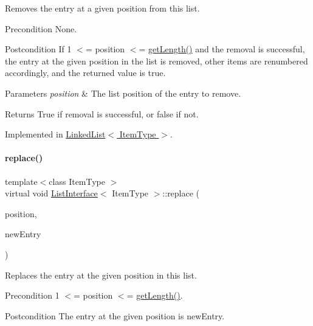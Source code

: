 Removes the entry at a given position from this list. \begin{DoxyPrecond}{Precondition}
None. 
\end{DoxyPrecond}
\begin{DoxyPostcond}{Postcondition}
If 1 $<$= position $<$= \hyperlink{class_list_interface_afc85695d4137f1e29ff02e179c9f3221}{get\+Length()} and the removal is successful, the entry at the given position in the list is removed, other items are renumbered accordingly, and the returned value is true. 
\end{DoxyPostcond}

\begin{DoxyParams}{Parameters}
{\em position} & The list position of the entry to remove. \\
\hline
\end{DoxyParams}
\begin{DoxyReturn}{Returns}
True if removal is successful, or false if not. 
\end{DoxyReturn}


Implemented in \hyperlink{class_linked_list_a16a02716b5b2efb6fb1e3d18721b53e4}{Linked\+List$<$ Item\+Type $>$}.

\hypertarget{class_list_interface_aae877a56b7b9f5f526c37a00e234fad1}{}\label{class_list_interface_aae877a56b7b9f5f526c37a00e234fad1} 
\paragraph{\texorpdfstring{replace()}{replace()}}
{\footnotesize\ttfamily template$<$class Item\+Type $>$ \\
virtual void \hyperlink{class_list_interface}{List\+Interface}$<$ Item\+Type $>$\+::replace (\begin{DoxyParamCaption}\item[{int}]{position,  }\item[{const Item\+Type \&}]{new\+Entry }\end{DoxyParamCaption})\hspace{0.3cm}{\ttfamily [pure virtual]}}

Replaces the entry at the given position in this list. \begin{DoxyPrecond}{Precondition}
1 $<$= position $<$= \hyperlink{class_list_interface_afc85695d4137f1e29ff02e179c9f3221}{get\+Length()}. 
\end{DoxyPrecond}
\begin{DoxyPostcond}{Postcondition}
The entry at the given position is new\+Entry. 
\end{DoxyPostcond}

